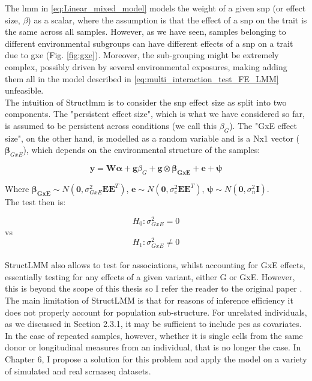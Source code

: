 The \gls{lmm} in \eqref{eq:Linear_mixed_model} models the weight of a given \gls{snp} (or effect size, $\beta$) as a scalar, where the assumption is that the effect of a \gls{snp} on the trait is the same across all samples.
However, as we have seen, samples belonging to different environmental subgroups can have different effects of a \gls{snp} on a trait due to \gls{gxe} (Fig. \ref{fig:gxe}).
Moreover, the sub-grouping might be extremely complex, possibly driven by several environmental exposures, making adding them all in the model described in \eqref{eq:multi_interaction_test_FE_LMM} unfeasible.\\

The intuition of Struct\gls{lmm} is to consider the \gls{snp} effect size as split into two components.
The "persistent effect size", which is what we have considered so far, is assumed to be persistent across conditions (we call this $\beta_G$). 
The "GxE effect size", on the other hand, is modelled as a random variable and is a Nx1 vector ($\boldsymbol{\beta}_{GxE}$), which depends on the environmental structure of the samples:

\begin{equation}\label{eq:StructLMM-int}
 \mathbf{y} =  \mathbf{W}\boldsymbol{\alpha} + \mathbf{g}\beta_G + \mathbf{g} \otimes \boldsymbol{\beta_{GxE}} + \mathbf{e} + \boldsymbol{\psi} 
\end{equation}

Where $\boldsymbol{\beta_{GxE}} \sim N(\mathbf{0}, \sigma^2_{GxE}\mathbf{E}\mathbf{E}^T)$, $\mathbf{e} \sim N(\mathbf{0}, \sigma^2_{e}\mathbf{E}\mathbf{E}^T)$, $\boldsymbol{\psi} \sim N(\mathbf{0}, \sigma^2_{n}\mathbf{I})$. \\

The test then is:

\begin{equation}
 H_{0}: \sigma^2_{GxE}=0 
\end{equation}
vs
\begin{equation}
 H_{1}: \sigma^2_{GxE} \neq 0 
\end{equation}\\

StructLMM also allows to test for associations, whilst accounting for GxE effects, essentially testing for any effects of a given variant, either G or GxE.
However, this is beyond the scope of this thesis so I refer the reader to the original paper \cite{moore2019linear}.\\

The main limitation of StructLMM is that for reasons of inference efficiency it does not properly account for population sub-structure.
For unrelated individuals, as we discussed in Section 2.3.1, it may be sufficient to include \gls{pc}s as covariates.
In the case of repeated samples, however, whether it is single cells from the same donor or longitudinal measures from an individual, that is no longer the case.
In Chapter 6, I propose a solution for this problem and apply the model on a variety of simulated and real \gls{scrnaseq} datasets.


